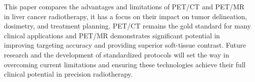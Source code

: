 

This paper compares the advantages and limitations of PET/CT and PET/MR in liver cancer radiotherapy, it has a focus on their impact on tumor delineation, dosimetry, and treatment planning. PET/CT remains the gold standard for many clinical applications and PET/MR demonstrates significant potential in improving targeting accuracy and providing superior soft-tissue contrast. Future research and the development of standardized protocols will set the way in overcoming current limitations and ensuring these technologies achieve their full clinical potential in precision radiotherapy.